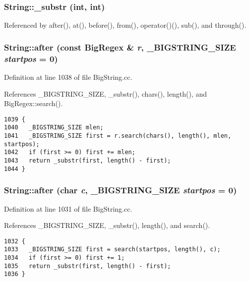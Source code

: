 \subsubsection{ String::\_\-substr (int, int)\hspace{0.3cm}{\tt  [protected]}}\label{classString_b5}




Referenced by after(), at(), before(), from(), operator()(), sub(), and through().
\subsubsection{ String::after (const {\bf Big\-Regex} \& {\em r}, {\bf \_\-BIGSTRING\_\-SIZE} {\em startpos} = 0)}\label{classString_a81}




Definition at line 1038 of file Big\-String.cc.

References \_\-BIGSTRING\_\-SIZE, \_\-substr(), chars(), length(), and Big\-Regex::search().



\footnotesize\begin{verbatim}1039 {
1040   _BIGSTRING_SIZE mlen;
1041   _BIGSTRING_SIZE first = r.search(chars(), length(), mlen, startpos);
1042   if (first >= 0) first += mlen;
1043   return _substr(first, length() - first);
1044 }
\end{verbatim}\normalsize 
{}
\subsubsection{ String::after (char {\em c}, {\bf \_\-BIGSTRING\_\-SIZE} {\em startpos} = 0)}\label{classString_a80}




Definition at line 1031 of file Big\-String.cc.

References \_\-BIGSTRING\_\-SIZE, \_\-substr(), length(), and search().



\footnotesize\begin{verbatim}1032 {
1033   _BIGSTRING_SIZE first = search(startpos, length(), c);
1034   if (first >= 0) first += 1;
1035   return _substr(first, length() - first);
1036 }
\end{verbatim}\normalsize 
{}
